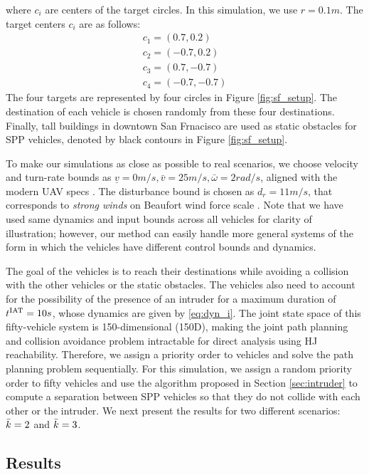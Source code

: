 \noindent where $c_i$ are centers of the target circles. In this simulation, we use $r = 0.1m$. The target centers $c_i$ are as follows:
\begin{equation} \label{eqn:NumIC}
\begin{aligned}
c_1 = (0.7, 0.2)\\
c_2 = (-0.7, 0.2)\\
c_3 = (0.7, -0.7)\\
c_4 = (-0.7, -0.7)
\end{aligned}
\end{equation}  
The four targets are represented by four circles in Figure \ref{fig:sf_setup}. The destination of each vehicle is chosen randomly from these four destinations. Finally, tall buildings in downtown San Frnacisco are used as static obstacles for SPP vehicles, denoted by black contours in Figure \ref{fig:sf_setup}.

To make our simulations as close as possible to real scenarios, we choose velocity and turn-rate bounds as $\underline{v} = 0m/s, \bar{v} = 25m/s, \bar\omega = 2 rad/s$, aligned with the modern UAV specs \cite{UAVspecs1, UAVspecs2}. The disturbance bound is chosen as $d_{r} = 11 m/s$, that corresponds to \textit{strong winds} on Beaufort wind force scale \cite{Windscale}. Note that we have used same dynamics and input bounds across all vehicles for clarity of illustration; however, our method can easily handle more general systems of the form in which the vehicles have different control bounds and dynamics.

The goal of the vehicles is to reach their destinations while avoiding a collision with the other vehicles or the static obstacles. The vehicles also need to account for the possibility of the presence of an intruder for a maximum duration of $t^\text{IAT} = 10s$, whose dynamics are given by \eqref{eq:dyn_i}. The joint state space of this fifty-vehicle system is 150-dimensional (150D), making the joint path planning and collision avoidance problem intractable for direct analysis using HJ reachability. Therefore, we assign a priority order to vehicles and solve the path planning problem sequentially. For this simulation, we assign a random priority order to fifty vehicles and use the algorithm proposed in Section \ref{sec:intruder}    to compute a separation between SPP vehicles so that they do not collide with each other or the intruder. We next present the results for two different scenarios: $\bar{k} = 2$ and $\bar{k} = 3$.

\subsection{Results \label{sec:simResults}}


